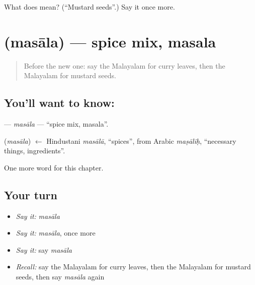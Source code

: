 \begin{tcolorbox}[breakable,colback=teal!4,colframe=teal!35!black,title={Before you move on}]
What does  mean? (\textquotedblleft{}Mustard seeds\textquotedblright{}.) Say it once more.
\end{tcolorbox}
\section[\texorpdfstring{\ml{മസാല} (masāla)}{മസാല (masāla)}]{ (masāla) — spice mix, masala}

\label{lesson:ML-C209-masala}



\begin{quote}
Before the new one: say the Malayalam for curry leaves, then the Malayalam for mustard seeds.
\end{quote}

\subsection*{You'll want to know: }
\textbf{} — \emph{masāla} — \textquotedblleft{}spice mix, masala\textquotedblright{}.

\begin{cousinweb}
\textbf{} (\emph{masāla}) $\leftarrow$ Hindustani \emph{masālā}, \textquotedblleft{}spices\textquotedblright{}, from Arabic \emph{maṣāliḥ}, \textquotedblleft{}necessary things, ingredients\textquotedblright{}.
\end{cousinweb}

\begin{grammarlens}[title={What you've built}]
One more word for this chapter.
\end{grammarlens}

\subsection*{Your turn}
\begin{itemize}
\raggedright
  \item \emph{Say it:} \emph{masāla}
  \item \emph{Say it:} \emph{masāla}, once more
  \item \emph{Say it:} say \emph{masāla}
  \item \emph{Recall:} say the Malayalam for curry leaves, then the Malayalam for mustard seeds, then say \emph{masāla} again
\end{itemize}


